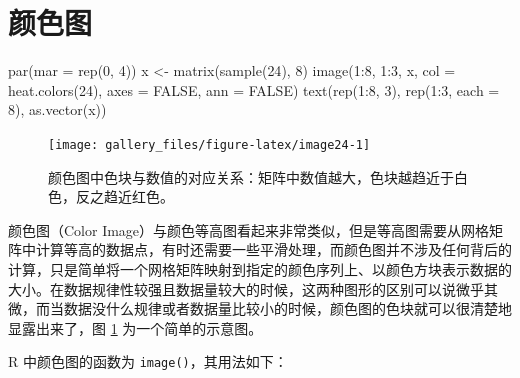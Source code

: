\documentclass[
  b5paper,
  UTF8,twoside]{book}
\newenvironment{Shaded}{\begin{snugshade}}{\end{snugshade}}
\newcommand{\AttributeTok}[1]{\textcolor[rgb]{0.77,0.63,0.00}{#1}}
\newcommand{\ConstantTok}[1]{\textcolor[rgb]{0.00,0.00,0.00}{#1}}
\newcommand{\DecValTok}[1]{\textcolor[rgb]{0.00,0.00,0.81}{#1}}
\newcommand{\FunctionTok}[1]{\textcolor[rgb]{0.00,0.00,0.00}{#1}}
\newcommand{\NormalTok}[1]{#1}
\newcommand{\OtherTok}[1]{\textcolor[rgb]{0.56,0.35,0.01}{#1}}
\newcommand{\SpecialCharTok}[1]{\textcolor[rgb]{0.00,0.00,0.00}{#1}}
\begin{document}
\hypertarget{sec:image}{%
\section{颜色图}\label{sec:image}}





\begin{Shaded}
\begin{Highlighting}[]
\FunctionTok{par}\NormalTok{(}\AttributeTok{mar =} \FunctionTok{rep}\NormalTok{(}\DecValTok{0}\NormalTok{, }\DecValTok{4}\NormalTok{))}
\NormalTok{x }\OtherTok{\textless{}{-}} \FunctionTok{matrix}\NormalTok{(}\FunctionTok{sample}\NormalTok{(}\DecValTok{24}\NormalTok{), }\DecValTok{8}\NormalTok{)}
\FunctionTok{image}\NormalTok{(}\DecValTok{1}\SpecialCharTok{:}\DecValTok{8}\NormalTok{, }\DecValTok{1}\SpecialCharTok{:}\DecValTok{3}\NormalTok{, x, }\AttributeTok{col =} \FunctionTok{heat.colors}\NormalTok{(}\DecValTok{24}\NormalTok{), }\AttributeTok{axes =} \ConstantTok{FALSE}\NormalTok{, }\AttributeTok{ann =} \ConstantTok{FALSE}\NormalTok{)}
\FunctionTok{text}\NormalTok{(}\FunctionTok{rep}\NormalTok{(}\DecValTok{1}\SpecialCharTok{:}\DecValTok{8}\NormalTok{, }\DecValTok{3}\NormalTok{), }\FunctionTok{rep}\NormalTok{(}\DecValTok{1}\SpecialCharTok{:}\DecValTok{3}\NormalTok{, }\AttributeTok{each =} \DecValTok{8}\NormalTok{), }\FunctionTok{as.vector}\NormalTok{(x))}
\end{Highlighting}
\end{Shaded}

\begin{figure}

{\centering \texttt{[image: gallery\_files/figure-latex/image24-1]} 

}

\caption[颜色图中色块与数值的对应关系]{颜色图中色块与数值的对应关系：矩阵中数值越大，色块越趋近于白色，反之趋近红色。}\label{fig:image24}
\end{figure}

颜色图（Color Image）与颜色等高图看起来非常类似，但是等高图需要从网格矩阵中计算等高的数据点，有时还需要一些平滑处理，而颜色图并不涉及任何背后的计算，只是简单将一个网格矩阵映射到指定的颜色序列上、以颜色方块表示数据的大小。在数据规律性较强且数据量较大的时候，这两种图形的区别可以说微乎其微，而当数据没什么规律或者数据量比较小的时候，颜色图的色块就可以很清楚地显露出来了，图 \ref{fig:image24}
为一个简单的示意图。

R 中颜色图的函数为 \texttt{image()}，其用法如下：
\end{document}
